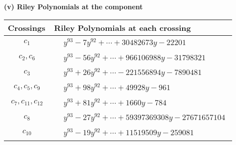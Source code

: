 \documentclass[1p]{elsarticle_modified}
\theoremstyle{definition}
\begin{document}
\flushleft \textbf{(v) Riley Polynomials at the component}\newline \\
\begin{tabular}{m{50pt}|m{274pt}}
Crossings & \hspace{64pt}Riley Polynomials at each crossing \\
\hline $$\begin{aligned}c_{1}\end{aligned}$$&$\begin{aligned}
&y^{93}-7 y^{92}+\cdots+30482673 y-22201
\end{aligned}$\\
\hline $$\begin{aligned}c_{2},c_{6}\end{aligned}$$&$\begin{aligned}
&y^{93}-56 y^{92}+\cdots+966106988 y-31798321
\end{aligned}$\\
\hline $$\begin{aligned}c_{3}\end{aligned}$$&$\begin{aligned}
&y^{93}+26 y^{92}+\cdots-221556894 y-7890481
\end{aligned}$\\
\hline $$\begin{aligned}c_{4},c_{5},c_{9}\end{aligned}$$&$\begin{aligned}
&y^{93}+98 y^{92}+\cdots+49928 y-961
\end{aligned}$\\
\hline $$\begin{aligned}c_{7},c_{11},c_{12}\end{aligned}$$&$\begin{aligned}
&y^{93}+81 y^{92}+\cdots+1660 y-784
\end{aligned}$\\
\hline $$\begin{aligned}c_{8}\end{aligned}$$&$\begin{aligned}
&y^{93}-27 y^{92}+\cdots+59397369308 y-27671657104
\end{aligned}$\\
\hline $$\begin{aligned}c_{10}\end{aligned}$$&$\begin{aligned}
&y^{93}-19 y^{92}+\cdots+11519509 y-259081
\end{aligned}$\\
\hline
\end{tabular}\\~\\
\end{document}

